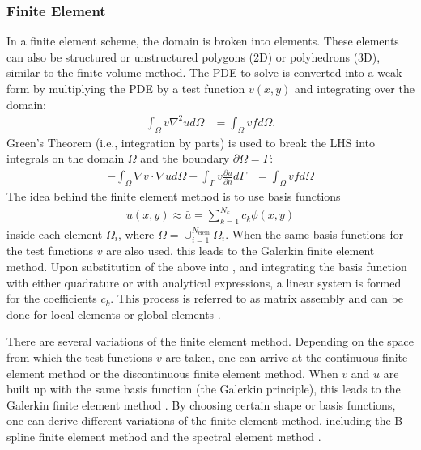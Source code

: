 \subsubsection{Finite Element}

In a finite element scheme, the domain is broken into elements. These elements can also be structured or unstructured polygons (2D) or polyhedrons (3D), similar to the finite volume method. The PDE to solve is converted into a weak form by multiplying the PDE by a test function $v(x,y)$ and integrating over the domain:
\begin{align}
    \int_{\Omega} v \nabla^2 u d\Omega &= \int_{\Omega} vf d\Omega.
\end{align}
Green's Theorem (i.e., integration by parts) is used to break the LHS into integrals on the domain $\Omega$ and the boundary $\partial \Omega = \Gamma$:
\begin{align}
    -\int_{\Omega} \nabla v \cdot \nabla u d\Omega + \int_{\Gamma} v \frac{\partial u}{\partial n} d\Gamma &= \int_{\Omega} vf d\Omega
    \label{eq:poisson_weak_form}
\end{align}
The idea behind the finite element method is to use basis functions
\begin{align}
    u(x,y) \approx \bar{u} = \sum_{k=1}^{N_k} c_k \phi(x,y)
\end{align}
inside each element $\Omega_i$, where $\Omega = \cup_{i = 1}^{N_{\text{elem}}} \Omega_i$. When the same basis functions for the test functions $v$ are also used, this leads to the Galerkin finite element method. Upon substitution of the above into , and integrating the basis function with either quadrature or with analytical expressions, a linear system is formed for the coefficients $c_k$. This process is referred to as matrix assembly and can be done for local elements or global elements \citep{giraldo2020introduction}.

There are several variations of the finite element method. Depending on the space from which the test functions $v$ are taken, one can arrive at the continuous finite element method or the discontinuous finite element method. When $v$ and $u$ are built up with the same basis function (the Galerkin principle), this leads to the Galerkin finite element method \citep{thomee2007galerkin}. By choosing certain shape or basis functions, one can derive different variations of the finite element method, including the B-spline finite element method \citep{kagan1998new} and the spectral element method \citep{patera1984spectral}.

